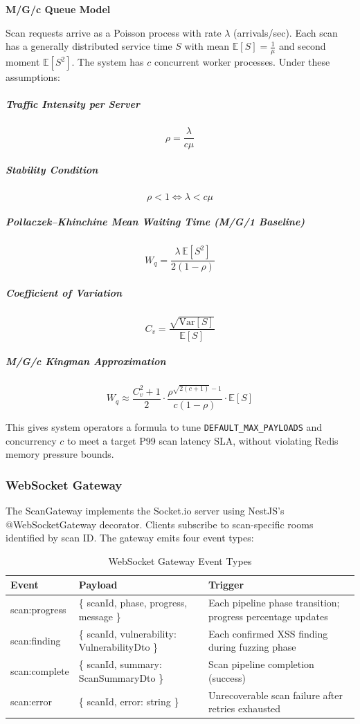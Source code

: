 \textbf{M/G/c Queue Model}

Scan requests arrive as a Poisson process with rate $\lambda$ (arrivals/sec). Each scan has a generally distributed service time $S$ with mean $
\mathbb{E}[S] = \frac{1}{\mu}
$
and second moment
$ \mathbb{E}[S^2].$
The system has $c$ concurrent worker processes. Under these assumptions:
\subparagraph*{Traffic Intensity per Server}

\[
\rho = \frac{\lambda}{c\mu}
\]

\subparagraph*{Stability Condition}

\[
\rho < 1
\iff
\lambda < c\mu
\]

\subparagraph*{Pollaczek--Khinchine Mean Waiting Time (M/G/1 Baseline)}

\[
W_q =
\frac{\lambda \, \mathbb{E}[S^2]}
     {2(1-\rho)}
\]

\subparagraph*{Coefficient of Variation}

\[
C_v =
\frac{\sqrt{\mathrm{Var}[S]}}
     {\mathbb{E}[S]}
\]

\subparagraph*{M/G/c Kingman Approximation}

\[
W_q \approx
\frac{C_v^2 + 1}{2}
\cdot
\frac{\rho^{\sqrt{2(c+1)} - 1}}
     {c(1-\rho)}
\cdot
\mathbb{E}[S]
\]

This gives system operators a formula to tune
\texttt{DEFAULT\_MAX\_PAYLOADS}
and concurrency $c$ to meet a target P99 scan latency SLA, without violating Redis memory pressure bounds.


\subsubsection{WebSocket Gateway}
The ScanGateway implements the Socket.io server using NestJS's @WebSocketGateway decorator. Clients subscribe to scan-specific rooms identified by scan ID. The gateway emits four
event types:

\begin{table}[h]
\centering
\renewcommand{\arraystretch}{1.5}
\begin{tabular}{|p{3cm}|p{6cm}|p{4cm}|}
\hline
\textbf{Event} &
\textbf{Payload} &
\textbf{Trigger} \\
\hline

scan:progress &
\{ scanId, phase, progress, message \} &
Each pipeline phase transition; progress percentage updates \\
\hline

scan:finding &
\{ scanId, vulnerability: VulnerabilityDto \} &
Each confirmed XSS finding during fuzzing phase \\
\hline

scan:complete &
\{ scanId, summary: ScanSummaryDto \} &
Scan pipeline completion (success) \\
\hline

scan:error &
\{ scanId, error: string \} &
Unrecoverable scan failure after retries exhausted \\
\hline

\end{tabular}
\caption{WebSocket Gateway Event Types}
\end{table}

